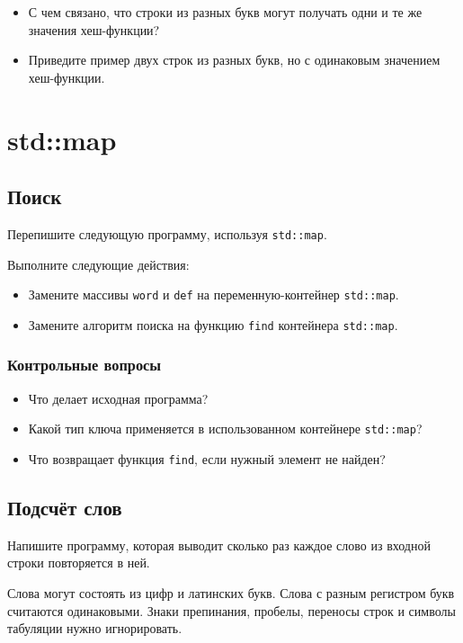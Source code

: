 \documentclass[10pt,twoside,openany]{book}
\begin{document}
\begin{itemize}
    \item С чем связано, что строки из разных букв могут получать одни и те же значения
          хеш-функции?
    \item Приведите пример двух строк из разных букв, но с одинаковым значением хеш-функции.
\end{itemize}

\chapter{std::map}

\section{Поиск}

Перепишите следующую программу, используя {\tt std::map}.

Выполните следующие действия:
\begin{itemize}
    \item Замените массивы {\tt word} и {\tt def} на переменную-контейнер {\tt std::map}.
    \item Замените алгоритм поиска на функцию {\tt find} контейнера {\tt std::map}.
\end{itemize}



\subsection*{Контрольные вопросы}

\begin{itemize}
    \item Что делает исходная программа?
    \item Какой тип ключа применяется в использованном контейнере {\tt std::map}?
    \item Что возвращает функция {\tt find}, если нужный элемент не найден?
\end{itemize}

\section{Подсчёт слов}

Напишите программу, которая выводит сколько раз каждое слово из входной строки повторяется в ней.

Слова могут состоять из цифр и латинских букв. Слова с разным регистром букв считаются одинаковыми.
Знаки препинания, пробелы, переносы строк и символы табуляции нужно игнорировать.
\end{document}
